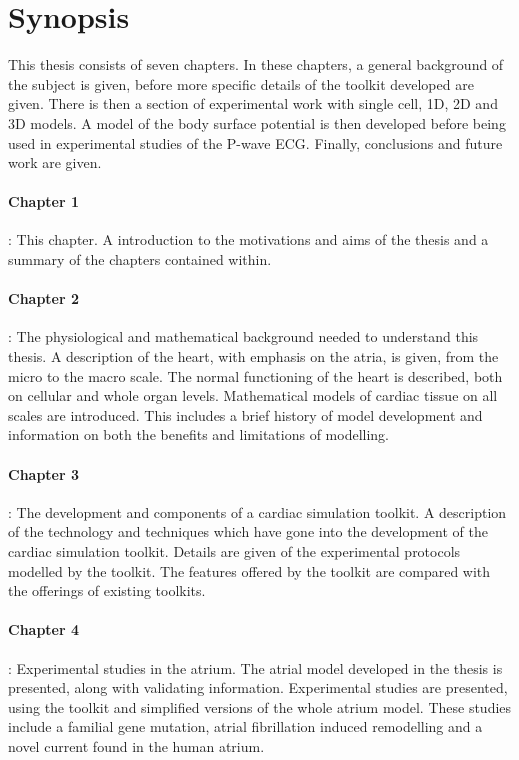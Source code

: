 \section{Synopsis}

This thesis consists of seven chapters.
In these chapters, a general background of the subject is given, before more
specific details of the toolkit developed are given.
There is then a section of experimental work with single cell, 1D, 2D and 3D
models.
A model of the body surface potential is then developed before being used in
experimental studies of the P-wave ECG.
Finally, conclusions and future work are given.

\paragraph{Chapter 1}: This chapter.
A introduction to the motivations and aims of the thesis and a summary of the
chapters contained within.

\paragraph{Chapter 2}: The physiological and mathematical background needed to
understand this thesis.
A description of the heart, with emphasis on the atria, is given, from the micro to the macro scale.
The normal functioning of the heart is described, both on cellular and whole
organ levels.
Mathematical models of cardiac tissue on all scales are introduced.
This includes a brief history of model development and information on both the
benefits and limitations of modelling.

\paragraph{Chapter 3}: The development and components of a cardiac simulation
toolkit.
A description of the technology and techniques which have gone into the
development of the cardiac simulation toolkit.
Details are given of the experimental protocols modelled by the toolkit.
The features offered by the toolkit are compared with the offerings of existing
toolkits.

\paragraph{Chapter 4}: Experimental studies in the atrium.
The atrial model developed in the thesis is presented, along with validating
information.
Experimental studies are presented, using the toolkit and simplified
versions of the whole atrium model.
These studies include a familial gene mutation, atrial fibrillation induced
remodelling and a novel current found in the human atrium.

